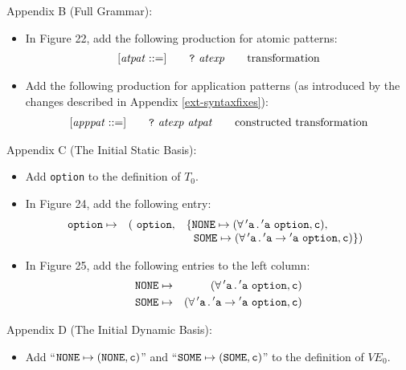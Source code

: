 \documentclass[twoside,titlepage]{article}
\begin{document}
\begin{appendix}
Appendix B (Full Grammar):
\begin{itemize}
\item In Figure 22, add the following production for atomic patterns:
  $$
  \begin{array}{l@{\qquad}l@{\qquad}l}
   [\mathit{atpat} ::=] & \mbox{\tt?}~\mathit{atexp} & \textrm{transformation}
  \end{array}
  $$

\item Add the following production for application patterns (as introduced by the changes described in Appendix \ref{ext-syntaxfixes}):
  $$
  \begin{array}{l@{\qquad}l@{\qquad}l}
   [\mathit{apppat} ::=] & \mbox{\tt?}~\mathit{atexp}~\mathit{atpat} & \textrm{constructed transformation}
  \end{array}
  $$
\end{itemize}

Appendix C (The Initial Static Basis):
\begin{itemize}
\item Add {\tt option} to the definition of $T_0$.

\item In Figure 24, add the following entry:
  \begin{eqnarray*}
  {\tt{option}} &\mapsto& (~{\tt{option}},~
  \begin{array}[t]{l}
  \{{\tt{NONE}}\mapsto(\forall\,{\tt'a}\,.\,{\tt'a~option},{\tt{c}}),\\
  ~~{\tt{SOME}}\mapsto(\forall\,{\tt'a}\,.\,{\tt'a}\to{\tt'a~option},{\tt{c}})\})
  \end{array}
  \end{eqnarray*}

\item In Figure 25, add the following entries to the left column:
  \begin{eqnarray*}
  {\tt{NONE}} &\mapsto& (\forall\,{\tt'a}\,.\,{\tt'a~option},{\tt{c}}) \\
  {\tt{SOME}} &\mapsto& (\forall\,{\tt'a}\,.\,{\tt'a}\to{\tt'a~option},{\tt{c}})
  \end{eqnarray*}
\end{itemize}

Appendix D (The Initial Dynamic Basis):
\begin{itemize}
\item Add ``${\tt{NONE}}\mapsto({\tt{NONE}},{\tt{c}})$'' and ``${\tt{SOME}}\mapsto({\tt{SOME}},{\tt{c}})$'' to the definition of $\mathit{VE}_0$.


\end{itemize}
\end{appendix}
\end{document}
